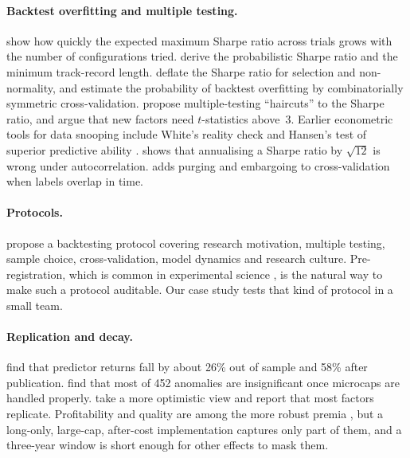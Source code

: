 \documentclass[11pt]{article}
\begin{document}
\paragraph{Backtest overfitting and multiple testing.} \citet{BaileyEtAl2014Notices} show how quickly the expected maximum Sharpe ratio across trials grows with the number of configurations tried. \citet{BaileyLopezDePrado2012} derive the probabilistic Sharpe ratio and the minimum track-record length. \citet{BaileyLopezDePrado2014} deflate the Sharpe ratio for selection and non-normality, and \citet{BaileyEtAl2017PBO} estimate the probability of backtest overfitting by combinatorially symmetric cross-validation. \citet{HarveyLiu2015} propose multiple-testing ``haircuts'' to the Sharpe ratio, and \citet{HarveyLiuZhu2016} argue that new factors need $t$-statistics above~3. Earlier econometric tools for data snooping include White's reality check \citep{White2000} and Hansen's test of superior predictive ability \citep{Hansen2005}. \citet{Lo2002} shows that annualising a Sharpe ratio by $\sqrt{12}$ is wrong under autocorrelation. \citet{LopezDePrado2018} adds purging and embargoing to cross-validation when labels overlap in time.

\paragraph{Protocols.} \citet{ArnottHarveyMarkowitz2019} propose a backtesting protocol covering research motivation, multiple testing, sample choice, cross-validation, model dynamics and research culture. Pre-registration, which is common in experimental science \citep{NosekEtAl2018Prereg}, is the natural way to make such a protocol auditable. Our case study tests that kind of protocol in a small team.

\paragraph{Replication and decay.} \citet{McLeanPontiff2016} find that predictor returns fall by about 26\% out of sample and 58\% after publication. \citet{HouXueZhang2020} find that most of 452 anomalies are insignificant once microcaps are handled properly. \citet{JensenKellyPedersen2023} take a more optimistic view and report that most factors replicate. Profitability and quality are among the more robust premia \citep{FamaFrench2015,AsnessFrazziniPedersen2019,NovyMarxVelikov2016}, but a long-only, large-cap, after-cost implementation captures only part of them, and a three-year window is short enough for other effects to mask them.
\end{document}
